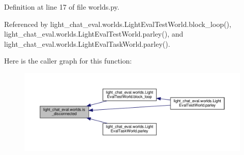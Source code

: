 Definition at line 17 of file worlds.\+py.



Referenced by light\+\_\+chat\+\_\+eval.\+worlds.\+Light\+Eval\+Test\+World.\+block\+\_\+loop(), light\+\_\+chat\+\_\+eval.\+worlds.\+Light\+Eval\+Test\+World.\+parley(), and light\+\_\+chat\+\_\+eval.\+worlds.\+Light\+Eval\+Task\+World.\+parley().

Here is the caller graph for this function\+:
\nopagebreak
\begin{figure}[H]
\begin{center}
\leavevmode
\includegraphics[width=350pt]{namespacelight__chat__eval_1_1worlds_a0813e8622db7b552e60a63826daf8ace_icgraph}
\end{center}
\end{figure}
